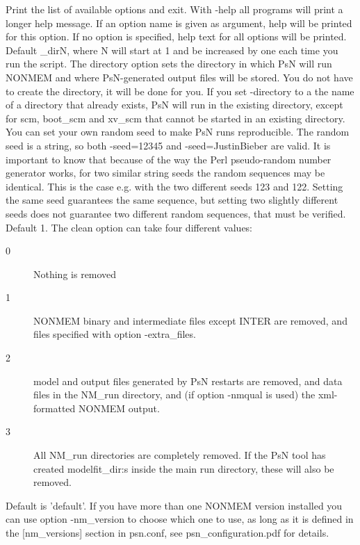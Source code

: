\begin{optionlist}
Print the list of available options and exit. 
\nextopt
{}
With -help all programs will print a longer help message. 
If an option name is given as argument, help will be printed for this option. 
If no option is specified, help text for all options will be printed. 
\nextopt
{}
Default \guidetoolname\_dirN,
where N will start at 1 and
be increased by one each time you run the script. The directory option sets the directory in which PsN 
will run NONMEM and where PsN-generated output files will be stored. 
You do not have to create the directory,  it will be done for you. If you set
-directory to a the name of a directory that already exists, PsN will run in the existing directory, except
for scm, boot\_scm and xv\_scm that cannot be started in an existing directory.
\nextopt
{}
You can set your own random seed to make PsN runs reproducible.
The random seed is a string, so both -seed=12345 and -seed=JustinBieber are valid.
It is important to know that because of the way the Perl pseudo-random
number generator works, for two similar string seeds the random sequences may be identical. 
This is the case e.g. with the two different seeds 123 and 122. 
Setting the same seed guarantees the same sequence, but setting two slightly different 
seeds does not guarantee two different random sequences, that must be verified.
\nextopt
{}
Default 1. The clean option can take four different values:  
\begin{description}
\item[0] Nothing is removed 
\item[1] NONMEM binary and intermediate files except INTER are removed, and files specified with option -extra\_files. 
\item[2] model and output files generated by PsN restarts are removed, and data files in the NM\_run directory, and (if option -nmqual is used) the xml-formatted NONMEM output. 
\item[3] All NM\_run directories are completely removed. If the PsN tool has created modelfit\_dir:s inside the main run directory, these  will also be removed. 
\end{description}
\nextopt
{}
Default is 'default'. 
If you have more than one NONMEM version installed you can use option
-nm\_version to choose which one to use, as long as it is 
defined in the [nm\_versions] section in psn.conf, see psn\_configuration.pdf for details. 

\end{optionlist}

